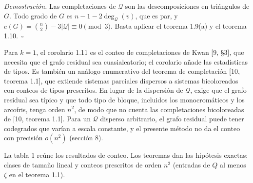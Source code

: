 \documentclass[spanish,11pt,a4paper]{article}
\begin{document}
\emph{Demostración.} Las completaciones de \(\mathcal Q\) son las descomposiciones en triángulos de \(G\). Todo grado de \(G\) es \(n-1-2\deg_{\mathcal Q}(v)\), que es par, y \(e(G)=\binom n2-3|\mathcal Q|\equiv0\pmod 3\). Basta aplicar el teorema 1.9(a) y el teorema 1.10.~\(\square\)

Para \(k=1\), el corolario 1.11 es el conteo de completaciones de Kwan {[}9, §3{]}, que necesita que el grafo residual sea cuasialeatorio; el corolario añade las estadísticas de tipos. Es también un análogo enumerativo del teorema de completación {[}10, teorema 1.1{]}, que extiende sistemas parciales dispersos a sistemas bicoloreados con conteos de tipos prescritos. En lugar de la dispersión de \(\mathcal Q\), exige que el grafo residual sea típico y que todo tipo de bloque, incluidos los monocromáticos y los arcoíris, tenga orden \(n^2\), de modo que no cuenta las completaciones bicoloreadas de {[}10, teorema 1.1{]}. Para un \(\mathcal Q\) disperso arbitrario, el grafo residual puede tener codegrados que varían a escala constante, y el presente método no da el conteo con precisión \(o(n^2)\) (sección 8).

La tabla 1 reúne los resultados de conteo. Los teoremas dan las hipótesis exactas: clases de tamaño lineal y conteos prescritos de orden \(n^2\) (entradas de \(Q\) al menos \(\zeta\) en el teorema 1.1).
\end{document}
